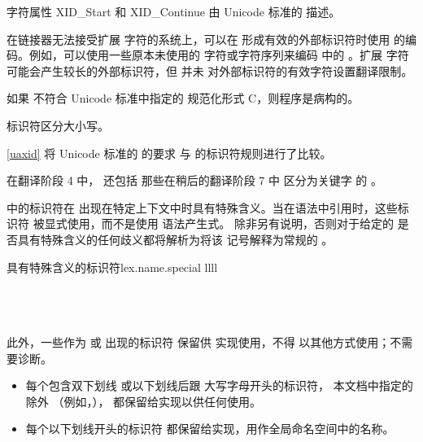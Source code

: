 \pnum
{}%
%
\begin{note}
字符属性 XID_Start 和 XID_Continue 由 Unicode 标准的  描述。
\begin{footnote}
在链接器无法接受扩展
字符的系统上，可以在
形成有效的外部标识符时使用  的编码。例如，可以使用一些原本未使用的
字符或字符序列来编码
 中的 。扩展
字符可能会产生较长的外部标识符，但 \Cpp{} 并未
对外部标识符的有效字符设置翻译限制。
\end{footnote}
\end{note}
如果  不符合 Unicode 标准中指定的
规范化形式 C，则程序是病构的。
\begin{note}
标识符区分大小写。
\end{note}
\begin{note}
\ref{uaxid} 将 Unicode 标准的  的要求
与 \Cpp{} 的标识符规则进行了比较。
\end{note}
\begin{note}
在翻译阶段 4 中，
 还包括
那些在稍后的翻译阶段 7 中
区分为关键字 的 。
\end{note}

\pnum
{}%
%
%
%
 中的标识符在
出现在特定上下文中时具有特殊含义。当在语法中引用时，这些标识符
被显式使用，而不是使用  语法产生式。
除非另有说明，否则对于给定的
 是否具有特殊含义的任何歧义都将解析为将该
记号解释为常规的 。

\begin{multicolfloattable}{具有特殊含义的标识符}{lex.name.special}
{llll}
           \\
\columnbreak
{}          \\
\columnbreak
{}          \\
\columnbreak
{}        \\
\end{multicolfloattable}

\pnum
{}%
%
%
此外，一些作为  或  出现的标识符
保留供 \Cpp{}
实现使用，不得
以其他方式使用；不需要诊断。
\begin{itemize}
\item
每个包含双下划线
\tcode{\unun}
%
或以下划线后跟
大写字母开头的标识符，
本文档中指定的除外
（例如，），
%
都保留给实现以供任何使用。
\item
每个以下划线开头的标识符
%
都保留给实现，用作全局命名空间中的名称。%
\end{itemize}%

